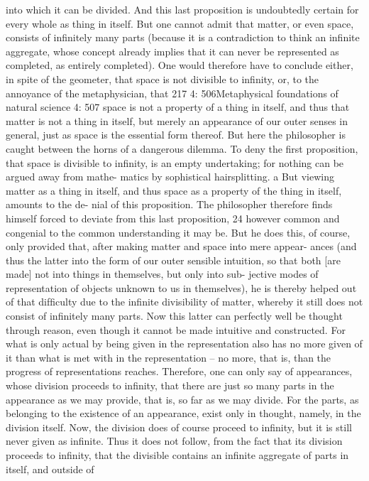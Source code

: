 into which it can be divided. And this last proposition is undoubtedly
certain for every whole as thing in itself. But one cannot admit that matter,
or even space, consists of inﬁnitely many parts (because it is a contradiction
to think an inﬁnite aggregate, whose concept already implies that it can
never be represented as completed, as entirely completed). One would
therefore have to conclude either, in spite of the geometer, that space is
not divisible to inﬁnity, or, to the annoyance of the metaphysician, that
217
4: 506Metaphysical foundations of natural science
4: 507
space is not a property of a thing in itself, and thus that matter is not a thing
in itself, but merely an appearance of our outer senses in general, just as
space is the essential form thereof.
But here the philosopher is caught between the horns of a dangerous
dilemma. To deny the ﬁrst proposition, that space is divisible to inﬁnity,
is an empty undertaking; for nothing can be argued away from mathe-
matics by sophistical hairsplitting. a But viewing matter as a thing in itself,
and thus space as a property of the thing in itself, amounts to the de-
nial of this proposition. The philosopher therefore ﬁnds himself forced
to deviate from this last proposition, 24 however common and congenial
to the common understanding it may be. But he does this, of course,
only provided that, after making matter and space into mere appear-
ances (and thus the latter into the form of our outer sensible intuition,
so that both [are made] not into things in themselves, but only into sub-
jective modes of representation of objects unknown to us in themselves),
he is thereby helped out of that difﬁculty due to the inﬁnite divisibility
of matter, whereby it still does not consist of inﬁnitely many parts. Now
this latter can perfectly well be thought through reason, even though
it cannot be made intuitive and constructed. For what is only actual by
being given in the representation also has no more given of it than what
is met with in the representation – no more, that is, than the progress
of representations reaches. Therefore, one can only say of appearances,
whose division proceeds to inﬁnity, that there are just so many parts in
the appearance as we may provide, that is, so far as we may divide. For
the parts, as belonging to the existence of an appearance, exist only in
thought, namely, in the division itself. Now, the division does of course
proceed to inﬁnity, but it is still never given as inﬁnite. Thus it does
not follow, from the fact that its division proceeds to inﬁnity, that the
divisible contains an inﬁnite aggregate of parts in itself, and outside of
